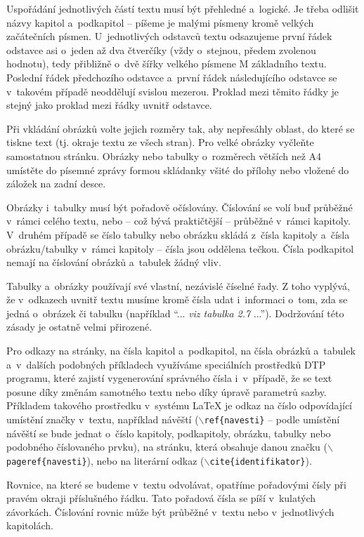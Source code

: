 Uspořádání jednotlivých částí textu musí být přehledné a~logické. Je třeba odlišit názvy kapitol a~podkapitol -- píšeme je malými písmeny kromě velkých začátečních písmen. U~jednotlivých odstavců textu odsazujeme první řádek odstavce asi o~jeden až dva čtverčíky (vždy o~stejnou, předem zvolenou hodnotu), tedy přibližně o~dvě šířky velkého písmene M základního textu. Poslední řádek předchozího odstavce a~první řádek následujícího odstavce se v~takovém případě neoddělují svislou mezerou. Proklad mezi těmito řádky je stejný jako proklad mezi řádky uvnitř odstavce.

Při vkládání obrázků volte jejich rozměry tak, aby nepřesáhly oblast, do které se tiskne text (tj. okraje textu ze všech stran). Pro velké obrázky vyčleňte samostatnou stránku. Obrázky nebo tabulky o~rozměrech větších než A4 umístěte do písemné zprávy formou skládanky všité do přílohy nebo vložené do záložek na zadní desce.

Obrázky i~tabulky musí být pořadově očíslovány. Číslování se volí buď průběžné v~rámci celého textu, nebo -- což bývá praktičtější -- průběžné v~rámci kapitoly. V~druhém případě se číslo tabulky nebo obrázku skládá z~čísla kapitoly a~čísla obrázku/tabulky v~rámci kapitoly -- čísla jsou oddělena tečkou. Čísla podkapitol nemají na číslování obrázků a~tabulek žádný vliv.

Tabulky a~obrázky používají své vlastní, nezávislé číselné řady. Z toho vyplývá, že v~odkazech uvnitř textu musíme kromě čísla udat i~informaci o~tom, zda se jedná o~obrázek či tabulku (například ``... {\it viz tabulka 2.7} ...''). Dodržování této zásady je ostatně velmi přirozené.

Pro odkazy na stránky, na čísla kapitol a~podkapitol, na čísla obrázků a~tabulek a~v~dalších podobných příkladech využíváme speciálních prostředků DTP programu, které zajistí vygenerování správného čísla i~v~případě, že se text posune díky změnám samotného textu nebo díky úpravě parametrů sazby. Příkladem takového prostředku v~systému LaTeX je odkaz na číslo odpovídající umístění značky v~textu, například návěští ($\backslash${\tt ref\{navesti\}} -- podle umístění návěští se bude jednat o~číslo kapitoly, podkapitoly, obrázku, tabulky nebo podobného číslovaného prvku), na stránku, která obsahuje danou značku ($\backslash${\tt pageref\{navesti\}}), nebo na literární odkaz ($\backslash${\tt cite\{identifikator\}}).

Rovnice, na které se budeme v~textu odvolávat, opatříme pořadovými čísly při pravém okraji příslušného řádku. Tato pořadová čísla se píší v~kulatých závorkách. Číslování rovnic může být průběžné v~textu nebo v~jednotlivých kapitolách.

